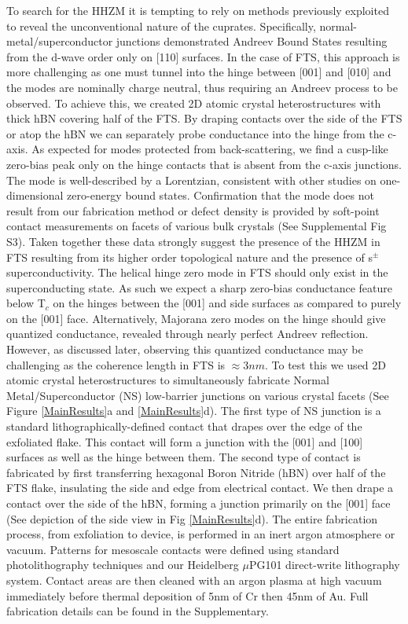 \par
To search for the HHZM it is tempting to rely on methods previously exploited to reveal the unconventional nature of the cuprates\cite{Deutscher2005}. Specifically, normal-metal/superconductor junctions demonstrated Andreev Bound States resulting from the d-wave order only on [110] surfaces\cite{Tanaka2003,Sinha1998,Greene1999,Tanaka2012}. In the case of FTS, this approach is more challenging as one must tunnel into the hinge between [001] and [010] and the modes are nominally charge neutral, thus requiring an Andreev process to be observed\cite{zhang2017quantum}.  To achieve this, we created 2D atomic crystal heterostructures with thick hBN covering half of the FTS. By draping contacts over the side of the FTS or atop the hBN we can separately probe conductance into the hinge from the c-axis. As expected for modes protected from back-scattering, we find a cusp-like zero-bias peak only on the hinge contacts that is absent from the c-axis junctions. The mode is well-described by a Lorentzian, consistent with other studies on one-dimensional zero-energy bound states\cite{Setiawan2017}. Confirmation that the mode does not result from our fabrication method or defect density is provided by soft-point contact measurements on facets of various bulk crystals (See Supplemental Fig S3). Taken together these data strongly suggest the presence of the HHZM in FTS resulting from its higher order topological nature and the presence of s$^{\pm}$ superconductivity\cite{Park:2010wo,Tanaka2012}. 
The helical hinge zero mode in FTS should only exist in the superconducting state. As such we expect a sharp zero-bias conductance feature below T$_{c}$ on the hinges between the [001] and side surfaces as compared to purely on the [001] face. Alternatively, Majorana zero modes on the hinge should give quantized conductance, revealed through nearly perfect Andreev reflection.\cite{DasSarma2018} However, as discussed later, observing this quantized conductance may be challenging as the coherence length in FTS is $\approx 3 nm$\cite{Kim2010,Bendele2010}. To test this we used 2D atomic crystal heterostructures to simultaneously fabricate Normal Metal/Superconductor (NS) low-barrier junctions on various crystal facets (See Figure \ref{MainResults}a and \ref{MainResults}d). The first type of NS junction is a standard lithographically-defined contact that drapes over the edge of the exfoliated flake. This contact will form a junction with the [001] and [100] surfaces as well as the hinge between them. The second type of contact is fabricated by first transferring hexagonal Boron Nitride (hBN) over half of the FTS flake, insulating the side and edge from electrical contact. We then drape a contact over the side of the hBN, forming a junction primarily on the [001] face (See depiction of the side view in Fig \ref{MainResults}d). The entire fabrication process, from exfoliation to device, is performed in an inert argon atmosphere or vacuum. Patterns for mesoscale contacts were defined using standard photolithography techniques and our Heidelberg $\mu$PG101 direct-write lithography system. Contact areas are then cleaned with an argon plasma at high vacuum immediately before thermal deposition of 5nm of Cr then 45nm of Au. Full fabrication details can be found in the Supplementary.
